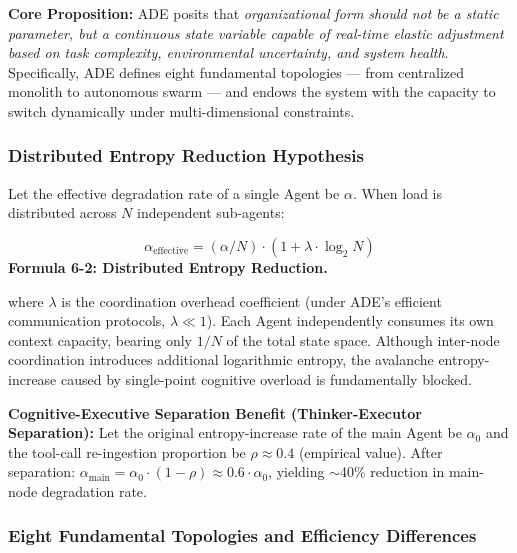 \documentclass[11pt,a4paper]{article}
\begin{document}
\textbf{Core Proposition:} ADE posits that \emph{organizational form should not be a static parameter, but a continuous state variable capable of real-time elastic adjustment based on task complexity, environmental uncertainty, and system health}. Specifically, ADE defines eight fundamental topologies --- from centralized monolith to autonomous swarm --- and endows the system with the capacity to switch dynamically under multi-dimensional constraints.

\subsubsection*{Distributed Entropy Reduction Hypothesis}

Let the effective degradation rate of a single Agent be $\alpha$. When load is distributed across $N$ independent sub-agents:

\begin{equation}\label{eq:distributed-entropy}
\alpha_{\text{effective}} = (\alpha / N) \cdot (1 + \lambda \cdot \log_2 N)
\end{equation}
\smallskip
\noindent\textbf{Formula 6-2: Distributed Entropy Reduction.}

where $\lambda$ is the coordination overhead coefficient (under ADE's efficient communication protocols, $\lambda \ll 1$). Each Agent independently consumes its own context capacity, bearing only $1/N$ of the total state space. Although inter-node coordination introduces additional logarithmic entropy, the avalanche entropy-increase caused by single-point cognitive overload is fundamentally blocked.

\textbf{Cognitive-Executive Separation Benefit (Thinker-Executor Separation):} Let the original entropy-increase rate of the main Agent be $\alpha_0$ and the tool-call re-ingestion proportion be $\rho \approx 0.4$ (empirical value). After separation: $\alpha_{\text{main}} = \alpha_0 \cdot (1 - \rho) \approx 0.6 \cdot \alpha_0$, yielding $\sim$40\% reduction in main-node degradation rate.

\subsubsection*{Eight Fundamental Topologies and Efficiency Differences}
\end{document}
